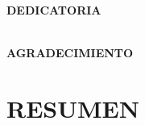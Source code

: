 \documentclass[12pt,a4paper,oneside]{report}
\begin{document}
\newpage
\newpage

\begin{titlepage}

\begin{flushright}
{\large \bf DEDICATORIA}
\\
\textit{}
\\
\textit{} %
\end{flushright}
\end{titlepage}


\begin{titlepage}

\begin{flushright}
{\large \bf AGRADECIMIENTO}
\\
\textit{}
{} %
\end{flushright}
\end{titlepage}


\tableofcontents
\cleardoublepage
\listoftables
\listoffigures 
\makegloss
\newpage


\chapter*{\centering \large RESUMEN} %
\doublespacing

\end{document}

